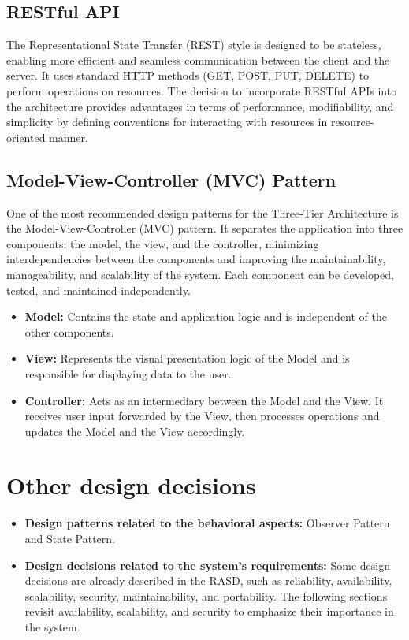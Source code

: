 \subsection{RESTful API}\label{subsec:restful api}
The Representational State Transfer (REST) style is designed to be stateless, enabling more efficient and seamless communication between the client and the server.
It uses standard HTTP methods (GET, POST, PUT, DELETE) to perform operations on resources.
The decision to incorporate RESTful APIs into the architecture provides advantages in terms of performance, modifiability, and simplicity by defining conventions 
for interacting with resources in resource-oriented manner.
\subsection{Model-View-Controller (MVC) Pattern}\label{subsec:model-view-controller pattern}
One of the most recommended design patterns for the Three-Tier Architecture is the Model-View-Controller (MVC) pattern. It separates the application into three 
components: the model, the view, and the controller, minimizing interdependencies between the components and improving the maintainability, manageability, and 
scalability of the system. Each component can be developed, tested, and maintained independently.
\begin{itemize}
\item \textbf{Model:} Contains the state and application logic and is independent of the other components.
\item \textbf{View:} Represents the visual presentation logic of the Model and is responsible for displaying data to the user.
\item \textbf{Controller:} Acts as an intermediary between the Model and the View. It receives user input forwarded by the View, then processes operations and 
updates the Model and the View accordingly.
\end{itemize}

\section{Other design decisions}\label{sec:other design decisions}
\begin{itemize}
    \item \textbf{Design patterns related to the behavioral aspects:} Observer Pattern and State Pattern.
    \item \textbf{Design decisions related to the system's requirements:} Some design decisions are already described in the RASD, such as reliability, availability, scalability, security, maintainability, and portability. 
    The following sections revisit availability, scalability, and security to emphasize their importance in the system.
\end{itemize}
